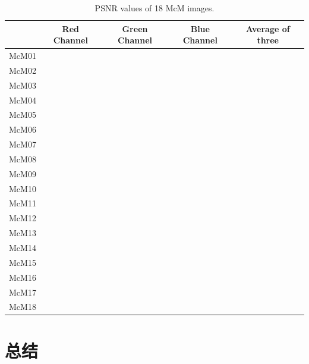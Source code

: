\documentclass[a4paper,11pt]{article}
\begin{document}
\begin{table}[h]
	\centering
	\caption{PSNR values of 18 McM images.}
	\label{tab:result_task4}
	\begin{tabular}{|c|c|c|c|c|}
		\hline
		 & Red Channel & Green Channel & Blue Channel & Average of three \\ \hline
		McM01 &  &  &  &  \\ \hline
		McM02 &  &  &  &  \\ \hline
		McM03 &  &  &  &  \\ \hline
		McM04 &  &  &  &  \\ \hline
		McM05 &  &  &  &  \\ \hline
		McM06 &  &  &  &  \\ \hline
		McM07 &  &  &  &  \\ \hline
		McM08 &  &  &  &  \\ \hline
		McM09 &  &  &  &  \\ \hline
		McM10 &  &  &  &  \\ \hline
		McM11 &  &  &  &  \\ \hline
		McM12 &  &  &  &  \\ \hline
		McM13 &  &  &  &  \\ \hline
		McM14 &  &  &  &  \\ \hline
		McM15 &  &  &  &  \\ \hline
		McM16 &  &  &  &  \\ \hline
		McM17 &  &  &  &  \\ \hline
		McM18 &  &  &  &  \\ \hline
	\end{tabular}
\end{table}

\clearpage


\section{总结}




\end{document}
